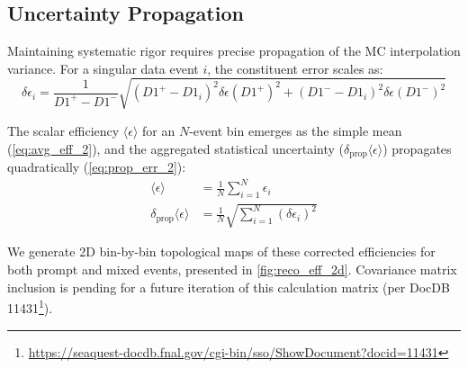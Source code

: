 \documentclass[11pt]{article}
\begin{document}
\subsection{Uncertainty Propagation}
Maintaining systematic rigor requires precise propagation of the MC interpolation variance. For a singular data event $i$, the constituent error scales as:
\begin{equation}
\delta\epsilon_i = \frac{1}{D1^+-D1^-}\sqrt{\left(D1^+-D1_i\right)^2\delta\epsilon(D1^+)^2+\left(D1^--D1_i\right)^2\delta\epsilon(D1^-)^2}
\end{equation}

The scalar efficiency $\langle\epsilon\rangle$ for an $N$-event bin emerges as the simple mean (\cref{eq:avg_eff_2}), and the aggregated statistical uncertainty ($\delta_{\text{prop}} \langle\epsilon\rangle$) propagates quadratically (\cref{eq:prop_err_2}):
\begin{align}
    \langle\epsilon\rangle &= \frac{1}{N} \sum_{i=1}^{N} \epsilon_i \label{eq:avg_eff_2} \\
    \delta_{\text{prop}} \langle\epsilon\rangle &= \frac{1}{N} \sqrt{\sum_{i=1}^{N} (\delta\epsilon_i)^2} \label{eq:prop_err_2}
\end{align}

We generate 2D bin-by-bin topological maps of these corrected efficiencies for both prompt and mixed events, presented in \cref{fig:reco_eff_2d}. Covariance matrix inclusion is pending for a future iteration of this calculation matrix (per DocDB 11431\footnote{\url{https://seaquest-docdb.fnal.gov/cgi-bin/sso/ShowDocument?docid=11431}}).
\end{document}
